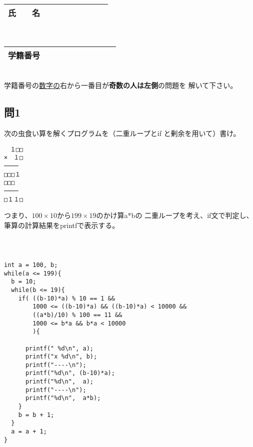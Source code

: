 \documentclass[a4j]{jarticle}
\def\ds{\displaystyle}
\begin{document}
\thispagestyle{empty}

\begin{multicols*}{2}%


\def\subst#1#2{$\ds #1$
 \ $\longrightarrow$\ 
 \underline{\hbox to 5cm{\ttfamily #2}}}



\noindent
\begin{tabular}[t]{|c|cccccccc|}\hline
氏　　名 & & & & & & & & \\ \hline
\end{tabular}\\
\begin{tabular}[t]{|c|c|c|c|c|c|c|c|c|c|}\hline
学籍番号 & & & & & & & & \\ \hline
\end{tabular}\\
学籍番号の\underline{数字の}右から一番目が{\bfseries 奇数の人は左側}の問題を
解いて下さい。
\vspace{-5ex}







\subsection*{問1}

次の虫食い算を解くプログラムを（二重ループと{\ttfamily if}
と剰余を用いて）書け。
\begin{verbatim}
　１□□
×　１□
────
□□□１
□□□
────
□１１□
\end{verbatim}
つまり、$100\times10$から$199\times19$のかけ算{\ttfamily a*b}の
二重ループを考え、{\ttfamily if}文で判定し、
筆算の計算結果を{\ttfamily printf}で表示する。


\ifnum {}
\begin{verbatim}

\end{verbatim}
\vspace{15cm}
\vfill
\mbox{}\\
\else
\begin{verbatim}
int a = 100, b;
while(a <= 199){
  b = 10;
  while(b <= 19){
    if( ((b-10)*a) % 10 == 1 &&
        1000 <= ((b-10)*a) && ((b-10)*a) < 10000 &&
        ((a*b)/10) % 100 == 11 &&
        1000 <= b*a && b*a < 10000
        ){

      printf(" %d\n", a);
      printf("x %d\n", b);
      printf("----\n");
      printf("%d\n", (b-10)*a);
      printf("%d\n",  a);
      printf("----\n");
      printf("%d\n",  a*b);
    }
    b = b + 1;
  }
  a = a + 1;
}



\end{verbatim}
\end{multicols*}
\end{document}

